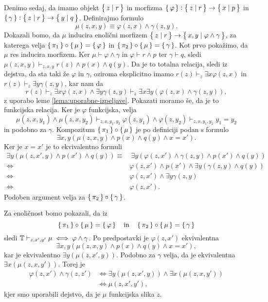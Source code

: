 \documentclass[../kategoricna_logika.tex]{subfiles}
\begin{document}
\begin{dokaz}
\begin{enumerate}[label=(\roman*)]
    Denimo sedaj, da imamo objekt $\left\lbrace\,z \mid r\,\right\rbrace$ in morfizma
    ${\left\lbrace\,\varphi\,\right\rbrace : \left\lbrace\,z \mid r\,\right\rbrace \to \left\lbrace\,x \mid p\,\right\rbrace}$ in
    $\left\lbrace\,\gamma\,\right\rbrace : \left\lbrace\,z \mid r\,\right\rbrace \to \left\lbrace\,y \mid q\,\right\rbrace$.  Definirajmo
    formulo
    \[ \mu(z,x,y) \equiv \varphi(z,x) \land \gamma(z,y). \] Dokazali
    bomo, da $\mu$ inducira enolični morfizem
    $\left\lbrace\,z \mid r\,\right\rbrace \to \left\lbrace\,x,y \mid \varphi \land \gamma\,\right\rbrace$, za
    katerega velja $\left\lbrace\,\pi_1\,\right\rbrace \circ \left\lbrace\,\mu\,\right\rbrace = \left\lbrace\,\varphi\,\right\rbrace$ in
    $\left\lbrace\,\pi_2\,\right\rbrace \circ \left\lbrace\,\mu\,\right\rbrace = \left\lbrace\,\gamma\,\right\rbrace$.  Kot prvo pokažimo,
    da $\mu$ res inducira morfizem.  Ker
    $\mu \vdash \varphi \land \gamma$ in $\varphi \vdash r \land p$
    ter $\gamma \vdash q$, sledi
    $\mu(z,x,y) \vdash_{z,x,y}r(z) \land p(x) \land q(y)$.  Da je to
    totalna relacija, sledi iz dejstva, da sta taki že $\varphi$ in
    $\gamma$, oziroma eksplicitno imamo
    $r(z) \vdash_z \exists x \varphi(z,x)$ in
    $r(z) \vdash_z \exists y \gamma(z,y)$, kar nam da
    \[ r(z) \vdash_z \exists x \varphi(z,x) \land \exists y
      \gamma(z,y) \vdash_z \exists x \exists y (\varphi(z,x) \land
      \gamma(z,y)), \] z uporabo leme \ref{lema:uporabne-izpeljave}.
    Pokazati moramo še, da je to funkcijska relacija.  Ker je
    $\varphi$ funkcijska, velja
    \[ \mu(z,x,y_1) \land \mu(z,x,y_2) \vdash_{z,x,y_1,y_2}
      \varphi(z,y_1) \land \varphi(z,y_2) \vdash_{z,x,y_1,y_2} y_1 =
      y_2 \] in podobno za $\gamma$.  Kompozitum
    $\left\lbrace\,\pi_1\,\right\rbrace \circ \left\lbrace\,\mu\,\right\rbrace$ je po definiciji podan s formulo
    \[ \exists x,y(\mu(z,x,y) \land p(x) \land q(y) \land x=x').\] Ker
    je $x = x'$ je to ekvivalentno formuli
    \begin{align*}
      \exists y(\mu(z,x',y) \land p(x') \land q(y)) \equiv&\ 
                                                            \exists y(\varphi(z,x') \land \gamma(z,y) \land p(x') \land q(y)) \\
      \iff& \varphi(z,x') \land p(x') \land \exists y(\gamma(z,y) \land q(y)) \\
      \iff& \varphi(z,x') \land \exists y \gamma(z,y) \\
      \iff& \varphi(z,x').
    \end{align*}
    Podoben argument velja za $\left\lbrace\,\pi_2\,\right\rbrace \circ \left\lbrace\,\gamma\,\right\rbrace$.

    Za enoličnost bomo pokazali, da iz
    \[\left\lbrace\,\pi_1\,\right\rbrace \circ \left\lbrace\,\mu\,\right\rbrace = \left\lbrace\,\varphi\,\right\rbrace\quad \text{in}\quad
      \left\lbrace\,\pi_2\,\right\rbrace \circ \left\lbrace\,\mu\,\right\rbrace = \left\lbrace\,\gamma\,\right\rbrace\] sledi
    $\mathbb{T} \vdash_{z,x',y'} \mu \iff \varphi \land \gamma$.  Po
    predpostavki je $\varphi(z,x')$ ekvivalentna
    \[ \exists x,y(\mu(z,x,y) \land p(x) \land q(y) \land x=x'),\] kar
    je ekvivalentno $\exists y(\mu(z,x',y))$.  Podobno za $\gamma$
    velja, da je ekvivalentna $\exists x(\mu(z,x,y'))$. Torej je
    \begin{align*}
      \varphi(z,x') \land \gamma(z,z') &\iff \exists y(\mu(z,x',y)) \land \exists x(\mu(z,x,y')) \\
                                       &\iff \mu(z,x',y'),
    \end{align*}
    kjer smo uporabili dejstvo, da je $\mu$ funkcijska slika $z$.


\end{enumerate}
\end{dokaz}
\end{document}
